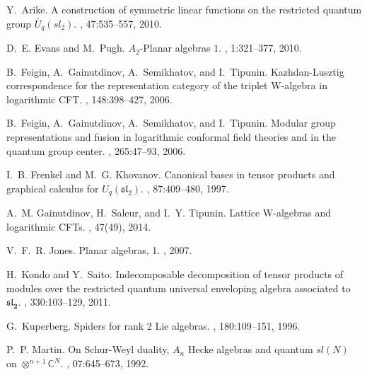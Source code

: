 \documentclass[]{article}
\begin{document}
\begin{thebibliography}{10}
	
	Y.~Arike.
	\newblock A construction of symmetric linear functions on the restricted
	quantum group $\bar{U}_{q}(\mathit{sl}_{2})$.
	, 47:535--557, 2010.
	
	D.~E. Evans and M.~Pugh.
	\newblock ${A}_2$-{P}lanar algebras $1$.
	, 1:321--377, 2010.
	
	B.~Feigin, A.~Gainutdinov, A.~Semikhatov, and I.~Tipunin.
	\newblock Kazhdan-{L}usztig correspondence for the representation category of
	the triplet {W}-algebra in logarithmic {CFT}.
	, 148:398--427, 2006.
	
	B.~Feigin, A.~Gainutdinov, A.~Semikhatov, and I.~Tipunin.
	\newblock Modular group representations and fusion in logarithmic conformal
	field theories and in the quantum group center.
	, 265:47--93, 2006.
	
	I.~B. Frenkel and M.~G. Khovanov.
	\newblock Canonical bases in tensor products and graphical calculus for
	${U}_q(\mathfrak{sl}_2)$.
	, 87:409--480, 1997.
	
	A.~M. Gainutdinov, H.~Saleur, and I.~Y. Tipunin.
	\newblock Lattice {W}-algebras and logarithmic {CFT}s.
	, 47(49),
	2014.
	
	V.~F.~R. Jones.
	\newblock Planar algebras, 1.
	, 2007.
	
	H.~Kondo and Y.~Saito.
	\newblock Indecomposable decomposition of tensor products of modules over the
	restricted quantum universal enveloping algebra associated to
	$\boldsymbol{\mathfrak{sl}_2}$.
	, 330:103--129, 2011.
	
	G.~Kuperberg.
	\newblock Spiders for rank 2 {L}ie algebras.
	, 180:109--151, 1996.
	
	P.~P. Martin.
	\newblock On {S}chur-{W}eyl duality, ${A}_n$ {H}ecke algebras and quantum
	$sl({N})$ on $\otimes^{n+1}\mathbb{C}^{N}$.
	, 07:645--673, 1992.
	

\end{thebibliography}
\end{document}
